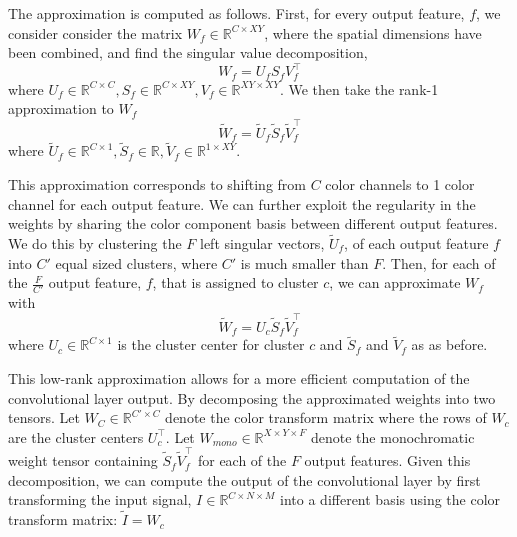 The approximation is computed as follows. First, for every output feature, $f$, we consider consider the matrix $W_f \in \mathbb{R}^{C \times XY }$, where the spatial dimensions have been combined, and find the singular value decomposition, 
\begin{equation*}
	W_f = U_f S_f V_f^{\top}
\end{equation*}
where $U_f \in \mathbb{R}^{C \times C}, S_f \in \mathbb{R}^{C \times XY}, V_f \in \mathbb{R}^{XY \times XY}$. We then take the rank-1 approximation to $W_f$ 
\begin{equation*}
	\tilde{W}_f = \tilde{U}_f \tilde{S}_f \tilde{V}_f^{\top}
\end{equation*}
where $\tilde{U}_f \in \mathbb{R}^{C \times 1}, \tilde{S}_f \in \mathbb{R}, \tilde{V}_f \in \mathbb{R}^{1 \times XY}$.

This approximation corresponds to shifting from $C$ color channels to 1 color channel for each output feature. We can further exploit the regularity in the weights by sharing the color component basis between different output features. We do this by clustering the $F$ left singular vectors,  $\tilde{U}_f$, of each output feature $f$ into $C'$ equal sized clusters, where $C'$ is much smaller than $F$. Then, for each of the $\frac{F}{C'}$ output feature, $f$, that is assigned to cluster $c$, we can approximate $W_f$ with
\begin{equation*}
	\tilde{W}_f = U_c \tilde{S}_f \tilde{V}_f^{\top}
\end{equation*}
where $U_c \in \mathbb{R}^{C \times 1}$ is the cluster center for cluster $c$ and $\tilde{S}_f$ and $\tilde{V}_f$ as as before. 

This low-rank approximation allows for a more efficient computation of the convolutional layer output. By decomposing the approximated weights into two tensors. Let $W_C \in \mathbb{R}^{C' \times C}$ denote the color transform matrix where the rows of $W_c$ are the cluster centers $U_c^{\top}$. Let $W_{mono} \in \mathbb{R}^{X \times Y \times F}$ denote the monochromatic weight tensor containing $ \tilde{S}_f \tilde{V}_f^{\top}$ for each of the $F$ output features. Given this decomposition, we can compute the output of the convolutional layer by first transforming the input signal, $I \in \mathbb{R}^{C \times N \times M}$ into a different basis using the color transform matrix: $\tilde{I} = W_c $

